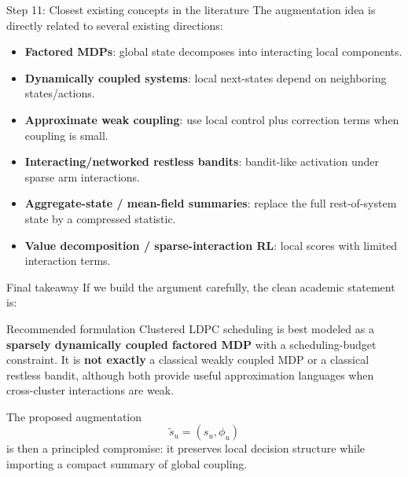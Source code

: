 \documentclass[aspectratio=169,professionalfonts]{beamer}
\begin{document}
\begin{frame}{Step 11: Closest existing concepts in the literature}
The augmentation idea is directly related to several existing directions:
\begin{itemize}
  \item \textbf{Factored MDPs}: global state decomposes into interacting local components.
  \item \textbf{Dynamically coupled systems}: local next-states depend on neighboring states/actions.
  \item \textbf{Approximate weak coupling}: use local control plus correction terms when coupling is small.
  \item \textbf{Interacting/networked restless bandits}: bandit-like activation under sparse arm interactions.
  \item \textbf{Aggregate-state / mean-field summaries}: replace the full rest-of-system state by a compressed statistic.
  \item \textbf{Value decomposition / sparse-interaction RL}: local scores with limited interaction terms.
\end{itemize}
\end{frame}

\begin{frame}{Final takeaway}
If we build the argument carefully, the clean academic statement is:

\vspace{0.5em}
\begin{block}{Recommended formulation}
Clustered LDPC scheduling is best modeled as a \textbf{sparsely dynamically coupled factored MDP} with a scheduling-budget constraint. It is \textbf{not exactly} a classical weakly coupled MDP or a classical restless bandit, although both provide useful approximation languages when cross-cluster interactions are weak.
\end{block}

\vspace{0.5em}
The proposed augmentation
\[
\tilde s_u=(s_u,\phi_u)
\]
is then a principled compromise: it preserves local decision structure while importing a compact summary of global coupling.
\end{frame}
\end{document}
